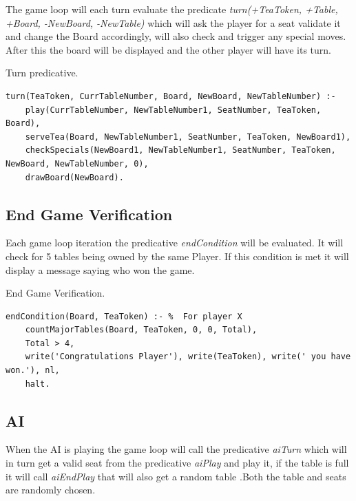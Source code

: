 \documentclass[a4paper]{article}
\begin{document}
The game loop will each turn evaluate the predicate \textit{turn(+TeaToken, +Table, +Board, -NewBoard, -NewTable)}
 which will ask the player for a seat validate it and change the Board accordingly, will also check and trigger any special moves.
  After this the board will be displayed
  and the other player will have its turn.

    \begin{listing}[H]
            \caption{Turn predicative.}
            \label{Codigo:cod_turn}
            \begin{verbatim}
turn(TeaToken, CurrTableNumber, Board, NewBoard, NewTableNumber) :-
    play(CurrTableNumber, NewTableNumber1, SeatNumber, TeaToken, Board),
    serveTea(Board, NewTableNumber1, SeatNumber, TeaToken, NewBoard1),
    checkSpecials(NewBoard1, NewTableNumber1, SeatNumber, TeaToken, NewBoard, NewTableNumber, 0),
    drawBoard(NewBoard).

    \end{verbatim}

    \end{listing}


\subsection{End Game Verification}
 Each game loop iteration the predicative \textit{endCondition} will be evaluated. It will check for 5 tables being owned by the same Player. If this condition is met it will
  display a message saying who won the game.

\renewcommand\listingscaption{Code}

\begin{listing}[H]
    \caption{End Game Verification.}
    \label{Codigo:cod_end}
    \begin{verbatim}
endCondition(Board, TeaToken) :- %  For player X
    countMajorTables(Board, TeaToken, 0, 0, Total),
    Total > 4,
    write('Congratulations Player'), write(TeaToken), write(' you have won.'), nl,
    halt.

\end{verbatim}

\end{listing}

\subsection{AI}
    When the AI is playing the game loop will call the predicative \textit{aiTurn} which will in turn get a valid seat
    from the predicative \textit{aiPlay} and play it, if the table is full it will call \textit{aiEndPlay} that will also get a random table
    .Both the table and seats are randomly chosen.
\end{document}

